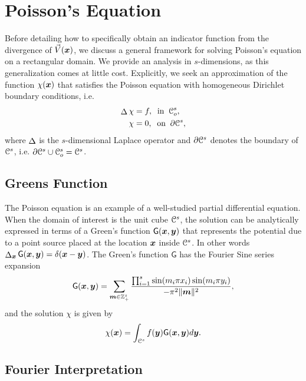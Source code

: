 \section{Poisson's Equation} 
Before detailing how to specifically obtain an indicator function from the divergence of $\vec{V}(\boldsymbol{x})$, we discuss a general framework for solving Poisson's equation on a rectangular domain. We provide an analysis in $s$-dimensions, as this generalization comes at little cost. Explicitly, we seek an approximation of the function $\chi(\boldsymbol{x})$ that satisfies the Poisson equation with homogeneous Dirichlet boundary conditions, i.e. 
\begin{equation} \label{eq:PoissonEquation}
	\begin{split}
		\laplacian{\chi} &= f, \;\; \text{in} \;\; \oucube^s, \\
		\chi &= 0, \;\; \text{on} \;\; \partial \ucube^s,
	\end{split}
\end{equation}
where $\mathop{\Delta}$ is the $s$-dimensional Laplace operator and
$\partial \mathcal{C}^s$ denotes the boundary of $\mathcal{C}^s$,
i.e. $\partial \mathcal{C}^s \cup \mathcal{C}_o^s = \mathcal{C}^s$.

\subsection{Greens Function}
The Poisson equation is an example of a well-studied partial differential equation. When the domain of interest is the unit cube $\mathcal{C}^s$, the solution can be analytically expressed in terms of a Green's function $\mathsf{G}(\boldsymbol{x},\boldsymbol{y})$ that represents the potential due to a point source placed at the location $\boldsymbol{x}$ inside $\mathcal{C}^s$.  In other words $\mathop{\Delta}_{\boldsymbol{x}} \mathsf{G}(\boldsymbol{x},\boldsymbol{y}) = \delta(\boldsymbol{x}-\boldsymbol{y})$. The Green's function $\mathsf{G}$ has the Fourier Sine series expansion 
\begin{equation}
	\mathsf{G}(\vect{x},\vect{y}) = \sum_{\vect{m} \in \ints^s_+} 
	\frac{\prod_{i=1}^s \sin(m_i \pi x_i) \sin(m_i \pi y_i)}
	{-\pi^2 \norm{\vect{m}}^2},
	\label{eq:green}
\end{equation}
and the solution $\chi$ is given by
\begin{equation}
	\chi(\vect{x}) = \int_{\ucube^s}f(\vect{y})\mathsf{G}(\vect{x},\vect{y}) d\vect{y}.
	\label{eq:analytic}
\end{equation}


\subsection{Fourier Interpretation}

